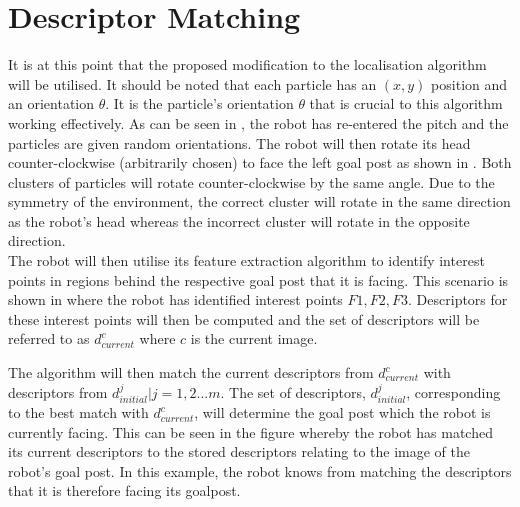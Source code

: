 \documentclass[11pt]{report}
\begin{document}
\section{Descriptor Matching}
\label{sec:disambiguation}
It is at this point that the proposed modification to the localisation algorithm will be utilised. It should be noted that each particle has an $(x,y)$ position and an orientation $\theta$. It is the particle's orientation $\theta$ that is crucial to this algorithm working effectively. As can be seen in , the robot has re-entered the pitch and the particles are given random orientations. The robot will then rotate its head counter-clockwise (arbitrarily chosen) to face the left goal post as shown in . Both clusters of particles will rotate counter-clockwise by the same angle. Due to the symmetry of the environment, the correct cluster will rotate in the same direction as the robot's head whereas the incorrect cluster will rotate in the opposite direction.\\

The robot will then utilise its feature extraction algorithm to identify interest points in regions behind the respective goal post that it is facing. This scenario is shown in  where the robot has identified interest points $F1, F2, F3$. Descriptors for these interest points will then be computed and the set of descriptors will be referred to as $d_{current}^c$ where $c$ is the current image.

The algorithm will then match the current descriptors from $d_{current}^c$ with descriptors from $d_{initial}^j|j=1,2...m$. The set of descriptors, $d_{initial}^j$, corresponding to the best match with $d_{current}^c$, will determine the goal post which the robot is currently facing. This can be seen in the figure whereby the robot has matched its current descriptors to the stored descriptors relating to the image of the robot's goal post. In this example, the robot knows from matching the descriptors that it is therefore facing its goalpost.\\
 
\end{document}
